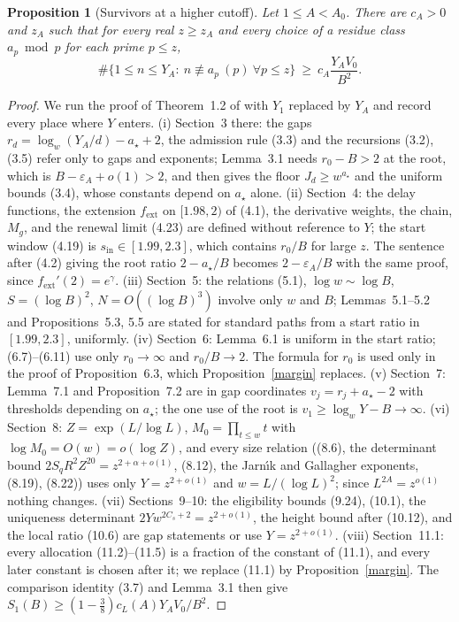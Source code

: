 \documentclass[11pt]{amsart}
\newtheorem{proposition}[lemma]{Proposition}
\newcommand{\Mg}{M_g}
\newcommand{\astar}{a_\star}
\newcommand{\fext}{f_{\mathrm{ext}}}
\newcommand{\eps}{\varepsilon}
\begin{document}
\begin{proposition}[Survivors at a higher cutoff]\label{surv}
Let $1\le A<A_0$. There are $c_A>0$ and $z_A$ such that for every real $z\ge z_A$ and every choice of a residue class $a_p\bmod p$ for each prime $p\le z$,
\[
\#\{1\le n\le Y_A:\ n\not\equiv a_p\ (p)\ \forall p\le z\}\ \ge\ c_A\frac{Y_AV_0}{B^2}.
\]
\end{proposition}
\begin{proof}
We run the proof of Theorem~1.2 of \cite{OAI} with $Y_1$ replaced by $Y_A$ and record every place where $Y$ enters.
(i) Section~3 there: the gaps $r_d=\log_w(Y_A/d)-\astar+2$, the admission rule (3.3) and the recursions (3.2), (3.5) refer only to gaps and exponents; Lemma~3.1 needs $r_0-B>2$ at the root, which is $B-\eps_A+o(1)>2$, and then gives the floor $J_d\ge w^{\astar}$ and the uniform bounds (3.4), whose constants depend on $\astar$ alone.
(ii) Section~4: the delay functions, the extension $\fext$ on $[1.98,2)$ of (4.1), the derivative weights, the chain, $\Mg$, and the renewal limit (4.23) are defined without reference to $Y$; the start window (4.19) is $s_{\mathrm{in}}\in[1.99,2.3]$, which contains $r_0/B$ for large $z$. The sentence after (4.2) giving the root ratio $2-\astar/B$ becomes $2-\eps_A/B$ with the same proof, since $\fext'(2)=e^\gamma$.
(iii) Section~5: the relations (5.1), $\log w\sim\log B$, $S=(\log B)^2$, $N=O((\log B)^3)$ involve only $w$ and $B$; Lemmas~5.1--5.2 and Propositions~5.3, 5.5 are stated for standard paths from a start ratio in $[1.99,2.3]$, uniformly.
(iv) Section~6: Lemma~6.1 is uniform in the start ratio; (6.7)--(6.11) use only $r_0\to\infty$ and $r_0/B\to2$. The formula for $r_0$ is used only in the proof of Proposition~6.3, which Proposition~\ref{margin} replaces.
(v) Section~7: Lemma~7.1 and Proposition~7.2 are in gap coordinates $v_j=r_j+\astar-2$ with thresholds depending on $\astar$; the one use of the root is $v_1\ge\log_wY-B\to\infty$.
(vi) Section~8: $Z=\exp(L/\log L)$, $M_0=\prod_{t\le w}t$ with $\log M_0=O(w)=o(\log Z)$, and every size relation ((8.6), the determinant bound $2S_qR^2Z^{20}=z^{2+\alpha+o(1)}$, (8.12), the Jarn\'{\i}k and Gallagher exponents, (8.19), (8.22)) uses only $Y=z^{2+o(1)}$ and $w=L/(\log L)^2$; since $L^{2A}=z^{o(1)}$ nothing changes.
(vii) Sections~9--10: the eligibility bounds (9.24), (10.1), the uniqueness determinant $2Yw^{2C_s+2}=z^{2+o(1)}$, the height bound after (10.12), and the local ratio (10.6) are gap statements or use $Y=z^{2+o(1)}$.
(viii) Section~11.1: every allocation (11.2)--(11.5) is a fraction of the constant of (11.1), and every later constant is chosen after it; we replace (11.1) by Proposition~\ref{margin}. The comparison identity (3.7) and Lemma~3.1 then give $S_1(B)\ge(1-\tfrac38)c_L(A)Y_AV_0/B^2$.
\end{proof}
\end{document}
